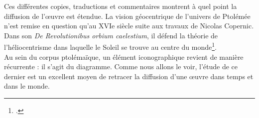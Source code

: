 Ces différentes copies, traductions et commentaires montrent à quel point la diffusion de l'œuvre est étendue. La vision géocentrique de l'univers de Ptolémée n'est remise en question qu'au XVIe  siècle suite aux travaux de Nicolas Copernic. Dans son \textit{De Revolutionibus orbium caelestium}, il défend la théorie de l'héliocentrisme dans laquelle le Soleil se trouve au centre du monde\footcite{verdetHELIOCENTRISME2008}. \\

Au sein du corpus ptolémaïque, un élément iconographique revient de manière récurrente : il s'agit du diagramme. Comme nous allons le voir, l'étude de ce dernier est un excellent moyen de retracer la diffusion d'une œuvre dans temps et dans le monde. 

